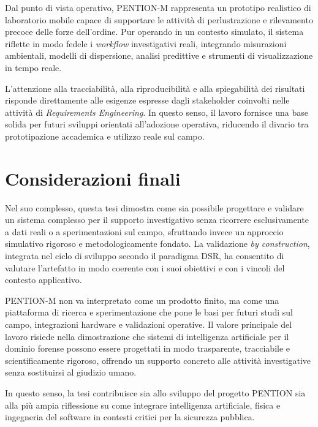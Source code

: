 Dal punto di vista operativo, \textsc{PENTION-M} rappresenta un prototipo realistico di laboratorio mobile capace di supportare le attività di perlustrazione e rilevamento precoce delle forze dell’ordine.
Pur operando in un contesto simulato, il sistema riflette in modo fedele i \textit{workflow} investigativi reali, integrando misurazioni ambientali, modelli di dispersione, analisi predittive e strumenti di visualizzazione in tempo reale.

L’attenzione alla tracciabilità, alla riproducibilità e alla spiegabilità dei risultati risponde direttamente alle esigenze espresse dagli stakeholder coinvolti nelle attività di \textit{Requirements Engineering}.
In questo senso, il lavoro fornisce una base solida per futuri sviluppi orientati all’adozione operativa, riducendo il divario tra prototipazione accademica e utilizzo reale sul campo.

\section{Considerazioni finali}

Nel suo complesso, questa tesi dimostra come sia possibile progettare e validare un sistema complesso per il supporto investigativo senza ricorrere esclusivamente a dati reali o a sperimentazioni sul campo, sfruttando invece un approccio simulativo rigoroso e metodologicamente fondato.
La validazione \textit{by construction}, integrata nel ciclo di sviluppo secondo il paradigma DSR, ha consentito di valutare l’artefatto in modo coerente con i suoi obiettivi e con i vincoli del contesto applicativo.

\textsc{PENTION-M} non va interpretato come un prodotto finito, ma come una piattaforma di ricerca e sperimentazione che pone le basi per futuri studi sul campo, integrazioni hardware e validazioni operative.
Il valore principale del lavoro risiede nella dimostrazione che sistemi di intelligenza artificiale per il dominio forense possono essere progettati in modo trasparente, tracciabile e scientificamente rigoroso, offrendo un supporto concreto alle attività investigative senza sostituirsi al giudizio umano.

In questo senso, la tesi contribuisce sia allo sviluppo del progetto \textsc{PENTION} sia alla più ampia riflessione su come integrare intelligenza artificiale, fisica e ingegneria del software in contesti critici per la sicurezza pubblica.